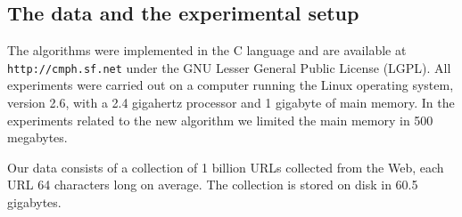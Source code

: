 \vspace{-2mm}
\subsection{The data and the experimental setup}
\label{sec:data-exper-set}

The algorithms were implemented in the C language and
are available at \texttt{http://\-cmph.sf.net}
under the GNU Lesser General Public License (LGPL).
All experiments were carried out on
a computer running the Linux operating system, version 2.6,
with a 2.4 gigahertz processor and
1 gigabyte of main memory. 
In the experiments related to the new
algorithm we limited the main memory in 500 megabytes.

Our data consists of a collection of 1 billion
URLs collected from the Web, each URL 64 characters long on average.
The collection is stored on disk in 60.5 gigabytes.

